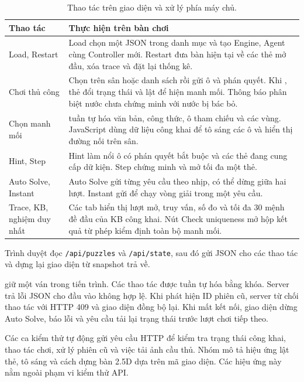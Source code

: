 \documentclass[11pt,a4paper]{article}
\newcommand{\code}[1]{\texttt{\detokenize{#1}}}
\newcommand{\pathcode}[1]{\nolinkurl{#1}}
\begin{document}
\begin{table}[htbp]
\caption{Thao tác trên giao diện và xử lý phía máy chủ.}
\label{tab:actions}
\small
\begin{tabularx}{\textwidth}{@{}L{35mm}Y@{}}
\toprule
\textbf{Thao tác}
& \textbf{Thực hiện trên bàn chơi}\\
\midrule

Load, Restart
& Load chọn một JSON trong danh mục và tạo Engine, Agent
cùng Controller mới.
Restart đưa bàn hiện tại về các thẻ mở đầu,
xóa trace và đặt lại thống kê.\\

Chơi thủ công
& Chọn trên sân hoặc danh sách rồi gửi ô và phán quyết.
Khi \code{ACCEPTED}, thẻ đổi trạng thái
và lật để hiện manh mối.
Thông báo phân biệt nước chưa chứng minh
với nước bị bác bỏ.\\

Chọn manh mối
& \code{Match} tuần tự hóa văn bản, công thức,
ô tham chiếu và các vùng.
JavaScript dùng dữ liệu công khai để tô sáng các ô
và hiển thị đường nối trên sân.\\

Hint, Step
& Hint làm nổi ô có phán quyết bắt buộc
và các thẻ đang cung cấp dữ kiện.
Step chứng minh và mở tối đa một thẻ.\\

Auto Solve, Instant
& Auto Solve gửi từng yêu cầu \code{step} theo nhịp,
có thể dừng giữa hai lượt.
Instant gửi \code{solve} để chạy vòng giải
trong một yêu cầu.\\

Trace, KB, nghiệm duy nhất
& Các tab hiển thị lượt mở, truy vấn, số đo
và tối đa 30 mệnh đề đầu của KB công khai.
Nút Check uniqueness mở hộp kết quả
từ phép kiểm định toàn bộ manh mối.\\

\bottomrule
\end{tabularx}
\end{table}

Trình duyệt đọc \pathcode{/api/puzzles} và
\pathcode{/api/state}, sau đó gửi JSON cho các thao tác
và dựng lại giao diện từ snapshot trả về.

\code{Match} giữ một ván trong tiến trình.
Các thao tác được tuần tự hóa bằng khóa.
Server trả lỗi JSON cho đầu vào không hợp lệ.
Khi phát hiện ID phiên cũ, server từ chối thao tác với
HTTP 409 và giao diện đồng bộ lại.
Khi mất kết nối, giao diện dừng Auto Solve, báo lỗi và yêu cầu
tải lại trạng thái trước lượt chơi tiếp theo.

Các ca kiểm thử tự động gửi yêu cầu HTTP để kiểm tra trạng thái
công khai, thao tác chơi, xử lý phiên cũ và việc tải ảnh cầu thủ.
Nhóm mô tả hiệu ứng lật thẻ, tô sáng và cách dựng bàn 2.5D
dựa trên mã giao diện.
Các hiệu ứng này nằm ngoài phạm vi kiểm thử API.
\end{document}
